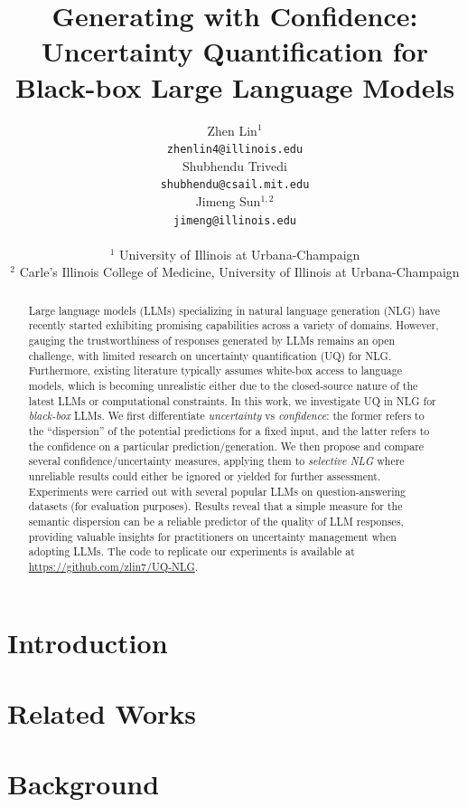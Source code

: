 \documentclass[10pt]{article} %
\title{Generating with Confidence: Uncertainty Quantification for Black-box Large Language Models}
\author{
  \name Zhen Lin$^{1}$ \\%
  \email \texttt{zhenlin4@illinois.edu} \\
  \AND
  \name Shubhendu Trivedi \\
  \email \texttt{shubhendu@csail.mit.edu} \\
  \AND 
  \name Jimeng Sun$^{1,2}$ \\
  \email \texttt{jimeng@illinois.edu} \\
  \\
${^1}$ University of Illinois at Urbana-Champaign\\
${^2}$ Carle’s Illinois College of Medicine, University of Illinois at Urbana-Champaign\\
}
\begin{document}
\maketitle

\begin{abstract}
Large language models (LLMs) specializing in natural language generation (NLG) have recently started exhibiting promising capabilities across a variety of domains. 
However, gauging the trustworthiness of responses generated by LLMs remains an open challenge, with limited research on uncertainty quantification (UQ) for NLG.
Furthermore, existing literature typically assumes white-box access to language models, which is becoming unrealistic either due to the closed-source nature of the latest LLMs or computational constraints. 
In this work, we investigate UQ in NLG for \textit{black-box} LLMs. 
We first differentiate \textit{uncertainty} vs \textit{confidence}: the former refers to the ``dispersion'' of the potential predictions for a fixed input, and the latter refers to the confidence on a particular prediction/generation.
We then propose and compare several confidence/uncertainty measures, applying them to \textit{selective NLG} where unreliable results could either be ignored or yielded for further assessment. 
Experiments were carried out with several popular LLMs on question-answering datasets (for evaluation purposes).
Results reveal that a simple measure for the semantic dispersion can be a reliable predictor of the quality of LLM responses, providing valuable insights for practitioners on uncertainty management when adopting LLMs.
The code to replicate our experiments is available at \url{https://github.com/zlin7/UQ-NLG}.
\end{abstract}


\section{Introduction}\label{sec:intro}


\section{Related Works}\label{sec:related}


\section{Background}\label{sec:background}

\end{document}
